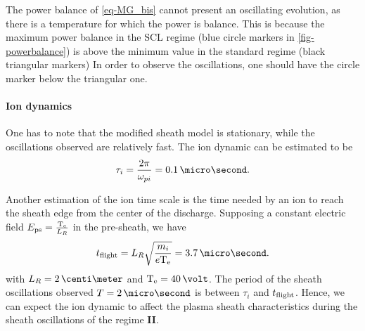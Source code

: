     The power balance of \cref{eq-MG_bis} cannot present an oscillating evolution, as there is a temperature for which the power is balance.
    This is because the maximum power balance in the \ac{SCL} regime (blue circle markers in  \cref{fig-powerbalance}) is above the minimum value in the standard regime (black triangular markers)
    In order to observe the oscillations, one should have the circle marker below the triangular one.
    
    
    
    \paragraph{ Ion dynamics \\}

    One has to note that the modified sheath model is stationary, while the oscillations observed are relatively fast.
    The ion dynamic can be estimated to be
    \begin{equation} \label{eq-ti}
      \tau_i = \frac{2 \pi}{\opi} = 0.1 \,\micro\second.
    \end{equation}
    
    Another estimation of the ion time scale is the time needed by an ion to reach the sheath edge from the center of the discharge.
    Supposing a constant electric field $E_{\rm ps} = \frac{\mathrm{T_e}}{L_R}$ in the pre-sheath, we have
    \begin{equation} \label{eq-tof}
      t_{\rm flight} = L_R \sqrt{\frac{m_i}{e \Te}} = 3.7 \,\micro\second.
    \end{equation}
    with $L_R=2\,\centi\meter$ and $\Te=40\,\volt$.
    The period of the sheath oscillations observed $T = 2\,\micro\second$ is between $\tau_i$ and $t_{\rm flight}$.
    Hence, we can expect the ion dynamic to affect the plasma sheath characteristics during the sheath oscillations of the regime {\bf II}.
    
